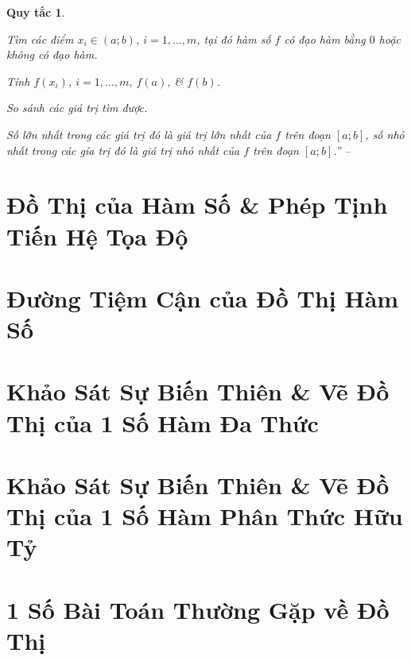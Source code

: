 \documentclass[oneside]{book}
\numberwithin{equation}{section}
\newtheorem{quytac}{Quy tắc}
\begin{document}
\begin{quytac}
	\begin{enumerate*}
		\item Tìm các điểm $x_i\in(a;b)$, $i = 1,\ldots,m$, tại đó hàm số $f$ có đạo hàm bằng $0$ hoặc không có đạo hàm.
		\item Tính $f(x_i)$, $i = 1,\ldots,m$, $f(a)$, \& $f(b)$.
		\item So sánh các giá trị tìm được.
	\end{enumerate*}
	Số lớn nhất trong các giá trị đó là giá trị lớn nhất của $f$ trên đoạn $[a;b]$, số nhỏ nhất trong các gía trị đó là giá trị nhỏ nhất của $f$ trên đoạn $[a;b]$.'' -- \cite[p. 21]{SGK_Toan_12_giai_tich_nang_cao}
\end{quytac}


\section{Đồ Thị của Hàm Số \& Phép Tịnh Tiến Hệ Tọa Độ}


\section{Đường Tiệm Cận của Đồ Thị Hàm Số}


\section{Khảo Sát Sự Biến Thiên \& Vẽ Đồ Thị của 1 Số Hàm Đa Thức}


\section{Khảo Sát Sự Biến Thiên \& Vẽ Đồ Thị của 1 Số Hàm Phân Thức Hữu Tỷ}


\section{1 Số Bài Toán Thường Gặp về Đồ Thị}
\end{document}
